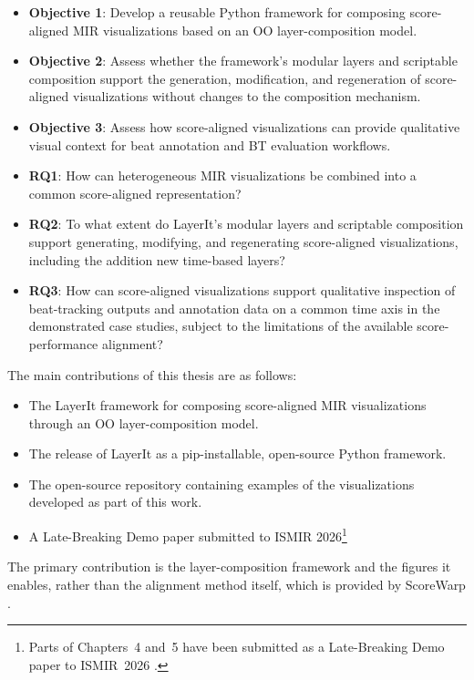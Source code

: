 \begin{itemize}
    \item \textbf{Objective 1}: Develop a reusable Python framework for composing score-aligned MIR visualizations based on an OO layer-composition model.
    \item \textbf{Objective 2}: Assess whether the framework's modular layers and scriptable composition support the generation, modification, and regeneration of score-aligned visualizations without changes to the composition mechanism.
    \item \textbf{Objective 3}: Assess how score-aligned visualizations can provide qualitative visual context for beat annotation and BT evaluation workflows.
\end{itemize}

\begin{itemize}
    \item \textbf{RQ1}: How can heterogeneous MIR visualizations be combined into a common score-aligned representation?
    \item \textbf{RQ2}: To what extent do LayerIt's modular layers and scriptable composition support generating, modifying, and regenerating score-aligned visualizations, including the addition new time-based layers?
    \item \textbf{RQ3}: How can score-aligned visualizations support qualitative inspection of beat-tracking outputs and annotation data on a common time axis in the demonstrated case studies, subject to the limitations of the available score-performance alignment?
\end{itemize}

The main contributions of this thesis are as follows:
\begin{itemize}
    \item The LayerIt framework for composing score-aligned MIR visualizations through an OO layer-composition model.
    \item The release of LayerIt as a pip-installable, open-source Python framework.
    \item The open-source repository containing examples of the visualizations developed as part of this work.
    \item A Late-Breaking Demo paper submitted to ISMIR 2026\footnote{Parts of Chapters~4 and~5 have been submitted as a Late-Breaking Demo paper to ISMIR~2026 \cite{azeredoLayerItTowardsFramework2026}.}
\end{itemize}

The primary contribution is the layer-composition framework and the figures it enables, rather than the alignment method itself, which is provided by ScoreWarp \cite{goeblLetsScoreWarpAgain2025a}.

